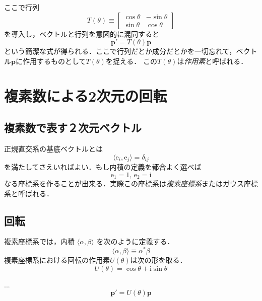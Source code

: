\documentclass{jsbook}
\newcommand{\keyword}[1]{\emph{#1}}
\newcommand{\one}{1}%
\newcommand{\im}{\mathrm{i}}%
\newcommand{\bvec}[1]{\boldsymbol{#1}}
\newcommand{\ve}{\mathrm{e}}
\begin{document}
ここで行列
\begin{equation}
T(\theta)\equiv\begin{bmatrix}\cos\theta&-\sin\theta\\\sin\theta&\cos\theta\end{bmatrix}
\end{equation}
を導入し，ベクトルと行列を意図的に混同すると
\begin{equation}
\bvec{p}'=T(\theta)\bvec{p}
\end{equation}
という簡潔な式が得られる．ここで行列だとか成分だとかを一切忘れて，ベクトル$\bvec{p}$に作用するものとして$T(\theta)$を捉える．
この$T(\theta)$は\keyword{作用素}と呼ばれる．

\section{複素数による2次元の回転}

\subsection{複素数で表す２次元ベクトル}

正規直交系の基底ベクトルとは
\begin{equation}
\langle\ve_i,\ve_j\rangle=\delta_{ij}
\end{equation}
を満たしてさえいればよい．もし内積の定義を都合よく選べば
\begin{equation}
\ve_1=\one,\,\ve_2=\im
\end{equation}
なる座標系を作ることが出来る．実際この座標系は\keyword{複素座標系}またはガウス座標系と呼ばれる．

\subsection{回転}

複素座標系では，内積 $\langle\alpha,\beta\rangle$ を次のように定義する．
\begin{equation}
\langle\alpha,\beta\rangle\equiv\alpha^*\beta
\end{equation}
複素座標系における回転の作用素$U(\theta)$は次の形を取る．
\begin{equation}
U(\theta)=\cos\theta+\im\sin\theta
\end{equation}
%
%

...
\begin{equation}
\bvec{p}'=U(\theta)\bvec{p}
\end{equation}
\end{document}
